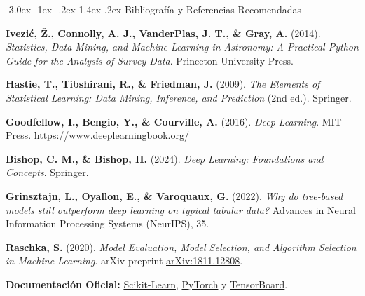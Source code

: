 \documentclass[11pt,a4paper]{article}
\makeatletter
\renewcommand\section{\@startsection{section}{1}{\z@}%
  {-3.0ex \@plus -1ex \@minus -.2ex}%
  {1.4ex \@plus .2ex}%
  {\color{NavyMain}\normalfont\Large\bfseries}}
\newcommand{\secrule}{\vspace{-0.55em}\noindent{\color{NavyMain}\rule{\textwidth}{0.6pt}}\par\vspace{0.45em}}
\let\origenumerate\enumerate
\let\endorigenumerate\endenumerate
\renewenvironment{enumerate}{\origenumerate\setlength{\itemsep}{2pt}\setlength{\parskip}{0pt}\setlength{\parsep}{0pt}}{\endorigenumerate}
\makeatother
\begin{document}
\section{Bibliografía y Referencias Recomendadas}
\label{sec:bibliografia}
\secrule

\begin{enumerate}
    \item \textbf{Ivezi\'{c}, \v{Z}., Connolly, A. J., VanderPlas, J. T., \& Gray, A.} (2014). \textit{Statistics, Data Mining, and Machine Learning in Astronomy: A Practical Python Guide for the Analysis of Survey Data}. Princeton University Press.
    \item \textbf{Hastie, T., Tibshirani, R., \& Friedman, J.} (2009). \textit{The Elements of Statistical Learning: Data Mining, Inference, and Prediction} (2nd ed.). Springer.
    \item \textbf{Goodfellow, I., Bengio, Y., \& Courville, A.} (2016). \textit{Deep Learning}. MIT Press. \url{https://www.deeplearningbook.org/}
    \item \textbf{Bishop, C. M., \& Bishop, H.} (2024). \textit{Deep Learning: Foundations and Concepts}. Springer.
    \item \textbf{Grinsztajn, L., Oyallon, E., \& Varoquaux, G.} (2022). \textit{Why do tree-based models still outperform deep learning on typical tabular data?} Advances in Neural Information Processing Systems (NeurIPS), 35.
    \item \textbf{Raschka, S.} (2020). \textit{Model Evaluation, Model Selection, and Algorithm Selection in Machine Learning}. arXiv preprint \href{https://arxiv.org/abs/1811.12808}{arXiv:1811.12808}.
    \item \textbf{Documentación Oficial:} \href{https://scikit-learn.org/stable/}{Scikit-Learn}, \href{https://pytorch.org/docs/stable/}{PyTorch} y \href{https://www.tensorflow.org/tensorboard}{TensorBoard}.
\end{enumerate}
\end{document}
